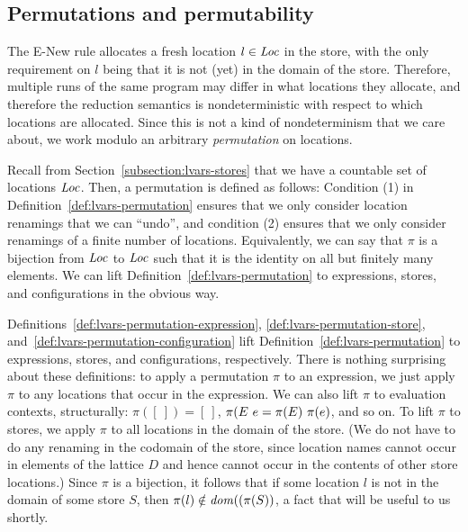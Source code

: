 \subsection{Permutations and permutability}\label{subsection:lvars-permutations}

The {\sc E-New} rule allocates a fresh location $l \in \mathit{Loc}$ in the
store, with the only requirement on $l$ being that it is not (yet) in
the domain of the store.  Therefore, multiple runs of the same program
may differ in what locations they allocate, and therefore the
reduction semantics is nondeterministic with respect to which
locations are allocated.  Since this is not a kind of nondeterminism
that we care about, we work modulo an arbitrary \emph{permutation} on
locations.

Recall from Section~\ref{subsection:lvars-stores} that we have a
countable set of locations $\mathit{Loc}$.  Then, a permutation is defined as
follows:
\LVarsDefPermutation
Condition (1) in Definition~\ref{def:lvars-permutation} ensures that
we only consider location renamings that we can ``undo'', and
condition (2) ensures that we only consider renamings of a finite
number of locations.  Equivalently, we can say that $\pi$ is a
bijection from $\mathit{Loc}$ to $\mathit{Loc}$ such that it is the identity on all
but finitely many elements.
\ifdefined\JOURNAL
We can lift Definition~\ref{def:lvars-permutation} to expressions,
stores, and configurations in the obvious way.
\fi

\ifdefined\DISSERTATION
Definitions~\ref{def:lvars-permutation-expression},
\ref{def:lvars-permutation-store},
and~\ref{def:lvars-permutation-configuration} lift
Definition~\ref{def:lvars-permutation} to expressions, stores, and
configurations, respectively.  There is nothing surprising about these
definitions: to apply a permutation $\pi$ to an expression, we just
apply $\pi$ to any locations that occur in the expression.  We can
also lift $\pi$ to evaluation contexts, structurally: $\pi([~]) =
[~]$, $\pi(E~e = \pi(E)~\pi(e)$, and so on.  To lift
$\pi$ to stores, we apply $\pi$ to all locations in the domain of the
store.  (We do not have to do any renaming in the codomain of the
store, since location names cannot occur in elements of the lattice
$D$ and hence cannot occur in the contents of other store locations.)
Since $\pi$ is a bijection, it follows that if some location $l$ is
not in the domain of some store $S$, then $\pi(l) \notin
\mathit{dom}((\pi(S))$, a fact that will be useful to us shortly.

\LVarsDefPermutationExpression

